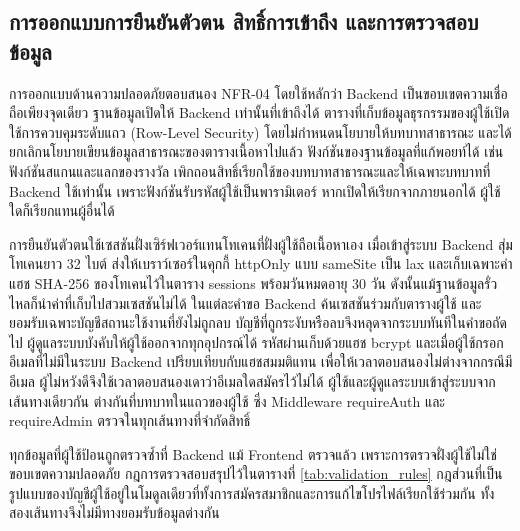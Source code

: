 \subsection{การออกแบบการยืนยันตัวตน สิทธิ์การเข้าถึง และการตรวจสอบข้อมูล}

การออกแบบด้านความปลอดภัยตอบสนอง NFR-04 โดยใช้หลักว่า Backend เป็นขอบเขตความเชื่อถือเพียงจุดเดียว ฐานข้อมูลเปิดให้ Backend เท่านั้นที่เข้าถึงได้ ตารางที่เก็บข้อมูลธุรกรรมของผู้ใช้เปิดใช้การควบคุมระดับแถว (Row-Level Security) โดยไม่กำหนดนโยบายให้บทบาทสาธารณะ และได้ยกเลิกนโยบายเขียนข้อมูลสาธารณะของตารางเนื้อหาไปแล้ว ฟังก์ชันของฐานข้อมูลที่แก้พอยท์ได้ เช่น ฟังก์ชันสแกนและแลกของรางวัล เพิกถอนสิทธิ์เรียกใช้ของบทบาทสาธารณะและให้เฉพาะบทบาทที่ Backend ใช้เท่านั้น เพราะฟังก์ชันรับรหัสผู้ใช้เป็นพารามิเตอร์ หากเปิดให้เรียกจากภายนอกได้ ผู้ใช้ใดก็เรียกแทนผู้อื่นได้

การยืนยันตัวตนใช้เซสชันฝั่งเซิร์ฟเวอร์แทนโทเคนที่ฝั่งผู้ใช้ถือเนื้อหาเอง เมื่อเข้าสู่ระบบ Backend สุ่มโทเคนยาว 32 ไบต์ ส่งให้เบราว์เซอร์ในคุกกี้ httpOnly แบบ sameSite เป็น lax และเก็บเฉพาะค่าแฮช SHA-256 ของโทเคนไว้ในตาราง sessions พร้อมวันหมดอายุ 30 วัน ดังนั้นแม้ฐานข้อมูลรั่วไหลก็นำค่าที่เก็บไปสวมเซสชันไม่ได้ ในแต่ละคำขอ Backend ค้นเซสชันร่วมกับตารางผู้ใช้ และยอมรับเฉพาะบัญชีสถานะใช้งานที่ยังไม่ถูกลบ บัญชีที่ถูกระงับหรือลบจึงหลุดจากระบบทันทีในคำขอถัดไป ผู้ดูแลระบบบังคับให้ผู้ใช้ออกจากทุกอุปกรณ์ได้ รหัสผ่านเก็บด้วยแฮช bcrypt และเมื่อผู้ใช้กรอกอีเมลที่ไม่มีในระบบ Backend เปรียบเทียบกับแฮชสมมติแทน เพื่อให้เวลาตอบสนองไม่ต่างจากกรณีมีอีเมล ผู้ไม่หวังดีจึงใช้เวลาตอบสนองเดาว่าอีเมลใดสมัครไว้ไม่ได้ ผู้ใช้และผู้ดูแลระบบเข้าสู่ระบบจากเส้นทางเดียวกัน ต่างกันที่บทบาทในแถวของผู้ใช้ ซึ่ง Middleware requireAuth และ requireAdmin ตรวจในทุกเส้นทางที่จำกัดสิทธิ์

ทุกข้อมูลที่ผู้ใช้ป้อนถูกตรวจซ้ำที่ Backend แม้ Frontend ตรวจแล้ว เพราะการตรวจฝั่งผู้ใช้ไม่ใช่ขอบเขตความปลอดภัย กฎการตรวจสอบสรุปไว้ในตารางที่ \ref{tab:validation_rules} กฎส่วนที่เป็นรูปแบบของบัญชีผู้ใช้อยู่ในโมดูลเดียวที่ทั้งการสมัครสมาชิกและการแก้ไขโปรไฟล์เรียกใช้ร่วมกัน ทั้งสองเส้นทางจึงไม่มีทางยอมรับข้อมูลต่างกัน

